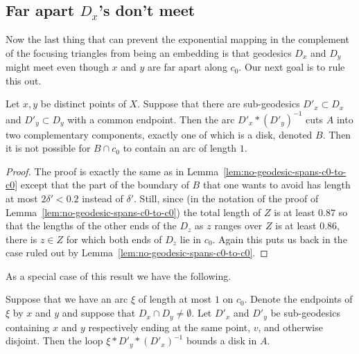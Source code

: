 \subsection{Far apart $D_x$'s don't meet}

Now the last thing that can prevent the exponential mapping in the
complement of the focusing triangles from being an embedding is that
geodesics $D_x$ and $D_y$ might meet even though $x$ and $y$ are far
apart along $c_0$. Our next goal is to rule this out.

\begin{lemma}
\label{lem:far-apart-geodesics-disjoint}
Let $x,y$ be distinct points of $X$. Suppose that there are
sub-geodesics $D'_x\subset D_x$ and $D'_y\subset D_y$ with a common
endpoint. Then the arc $D'_x*(D'_y)^{-1}$ cuts $A$ into two
complementary components, exactly one of which is a disk, denoted
$B$. Then it is not possible for  $B\cap c_0$ to contain an arc of
length $1$.
\end{lemma}

\begin{proof}
The proof is exactly the same as in Lemma~\ref{lem:no-geodesic-spans-c0-to-c0} except that
the part of the boundary of $B$ that one wants to avoid has length
at most $2\delta'<0.2$ instead of $\delta'$. Still, since (in the
notation of the proof of Lemma~\ref{lem:no-geodesic-spans-c0-to-c0}) the total length of
$Z$ is at least $0.87$ so that the lengths of the other ends of the
$D_z$ as $z$ ranges over $Z$ is at least $0.86$, there is $z\in Z$
for which both ends of $D_z$ lie in $c_0$. Again this puts us back
in the case ruled out by Lemma~\ref{lem:no-geodesic-spans-c0-to-c0}.
\end{proof}


As a special case of this result we have the following.

\begin{corollary}
\label{cor:focusing-triangle-from-short-arc}
\label{noholes}
Suppose that we have an arc $\xi$ of length at most $1$ on $c_0$.
Denote the endpoints of $\xi$ by $x$ and $y$ and  suppose that
$D_x\cap D_y\not=\emptyset$. Let $D'_x$ and $D'_y$ be sub-geodesics
containing $x$ and $y$ respectively ending at the same point, $v$,
and otherwise disjoint. Then the loop $\xi*D'_y*(D'_x)^{-1}$ bounds
a disk in $A$.
\end{corollary}


